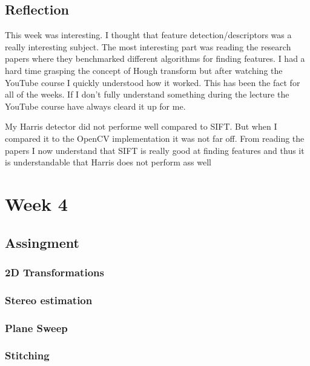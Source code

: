 \documentclass{article}
\begin{document}
    \subsection{Reflection}
    This week was interesting. 
    I thought that feature detection/descriptors was a really interesting subject.
    The most interesting part was reading the research papers where they benchmarked
    different algorithms for finding features. I had a hard time grasping the concept
    of Hough transform but after watching the YouTube course I quickly understood
    how it worked. This has been the fact for all of the weeks. If I don't fully
    understand something during the lecture the YouTube course have always cleard
    it up for me.

    My Harris detector did not performe well compared to SIFT. But when I compared it
    to the OpenCV implementation it was not far off. From reading the papers \cite{art1} \cite{tareen2018comparative}
    I now understand that SIFT is really good at finding features and thus it is understandable that
    Harris does not perform ass well


    \section{Week 4}
    \subsection{Assingment}
    \subsubsection{2D Transformations}
    \subsubsection{Stereo estimation}
    \subsubsection{Plane Sweep}
    \subsubsection{Stitching}
    
    \newpage
    \printbibliography
\end{document}
